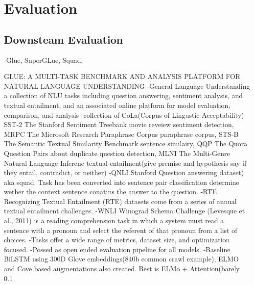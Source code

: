 \section{Evaluation}

\subsection{}
\subsection{Downsteam Evaluation}
-Glue, SuperGLue, Squad, 
\iffalse

GLUE: A MULTI-TASK BENCHMARK AND ANALYSIS PLATFORM FOR NATURAL LANGUAGE UNDERSTANDING
-General Language Understanding  a collection of NLU tasks including question answering, sentiment analysis,
and textual entailment, and an associated online platform for model evaluation, comparison, and
analysis
-collection of CoLa(Corpus of Lingustic Acceptability) SST-2 The Stanford Sentiment Treebank movie reveiew sentiment detection, MRPC The Microsoft Research Paraphrase Corpus paraphrase corpus, STS-B The Semantic Textual Similarity Benchmark sentence similairy, QQP The Quora Question Pairs about duplicate question detection, MLNI The Multi-Genre Natural Language Inferenc textual entailment(give premise and hypothesis say if they entail, contradict, or neither)
-QNLI Stanford Question answering dataset) aka squad. Task has been converted into sentence pair classification determine wether the context sentence conatins the answer to the question. 
-RTE Recognizing Textual Entailment (RTE) datasets come from a series of annual textual entailment challenges.
-WNLI Winograd Schema Challenge (Levesque et al., 2011) is a reading comprehension task
in which a system must read a sentence with a pronoun and select the referent of that pronoun from
a list of choices.
-Tasks offer a wide range of metrics, dataset size, and optimization focused. 
-Possed as open ended evaluation pipeline for all models. 
-Baseline BiLSTM using 300D Glove embeddings(840b common crawl example), ELMO and Cove based augmentations also created. Best is ELMo + Attention(barely 0.1%


